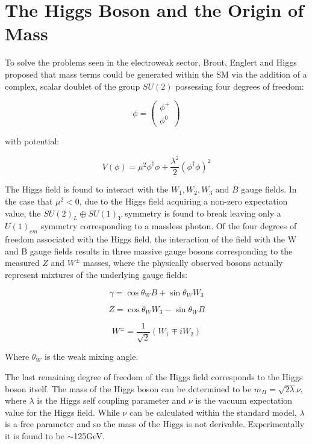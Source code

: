 \section{The Higgs Boson and the Origin of Mass}

To solve the problems seen in the electroweak sector, Brout, Englert and Higgs \cite{PhysRevLett.13.508}\cite{PhysRevLett.13.321} proposed that mass terms could be generated within the \ac{SM} via the addition of a complex, scalar doublet of the group $SU(2)$ possessing four degrees of freedom:

\begin{equation}
\phi = \begin{pmatrix} \phi^{+} \\ \phi^{0} \end{pmatrix} 
\end{equation}

with potential:

\begin{equation}
V(\phi) = \mu^{2}\phi^{\dagger}\phi + \frac{\lambda^{2}}{2}(\phi^{\dagger}\phi)^{2}
\end{equation}

The Higgs field is found to interact with the $W_{1},W_{2},W_{3}$ and $B$ gauge fields. In the case that $\mu^{2}<0$, due to the Higgs field acquiring a non-zero expectation value, the $SU(2)_{L}\oplus SU(1)_{Y}$ symmetry is found to break leaving only a $U(1)_{em}$ symmetry corresponding to a massless photon. Of the four degrees of freedom associated with the Higgs field, the interaction of the field with the W and B gauge fields results in three massive gauge bosons corresponding to the measured $Z$ and $W^{\pm}$ masses, where the physically observed bosons actually represent mixtures of the underlying gauge fields:

\begin{equation}
\gamma = \cos\theta_{W}B  +\sin\theta_{W}W_{3} 
\end{equation}

\begin{equation}
Z = \cos\theta_{W}W_{3}  -\sin\theta_{W}B
\end{equation}

\begin{equation}
W^{\pm}= \frac{1}{\sqrt{2}}(W_{1}\mp iW_{2})
\end{equation}

Where $\theta_{W}$ is the weak mixing angle.

The last remaining degree of freedom of the Higgs field corresponds to the Higgs boson itself. The mass of the Higgs boson can be determined to be $m_{H}=\sqrt{2\lambda}\nu$, where $\lambda$ is the Higgs self coupling parameter and $\nu$ is the vacuum expectation value for the Higgs field. While $\nu$ can be calculated within the standard model, $\lambda$ is a free parameter and so the mass of the Higgs is not derivable. Experimentally it is found to be $\sim$125GeV.

